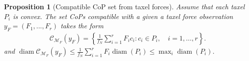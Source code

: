 \documentclass[11pt,a4paper]{article}
\theoremstyle{proposition}
\newtheorem{proposition}[theorem]{Proposition}
\begin{document}
\begin{proposition}[Compatible CoP set from taxel forces]
\label{prop:cop_taxel}
    Assume that each taxel $P_i$ is convex. The set CoPs compatible with a given a taxel force observation $y_F = (F_1,...,F_r)$ takes the form
    \begin{align}
        \mathcal C_{\mathcal M_F}(y_F)
        =
        \left\{
        \frac{1}{f_N}
        \sum_{i=1}^r F_i c_i
        :
        c_i\in P_i,\quad i=1,\ldots,r
        \right\}.
    \end{align}
    and $\operatorname{diam} \mathcal C_{\mathcal M_F}(y_F)\le\frac{1}{f_N}\sum_{i=1}^r F_i\operatorname{diam}(P_i)\le\max_i\operatorname{diam}(P_i).$
\end{proposition}
\end{document}
